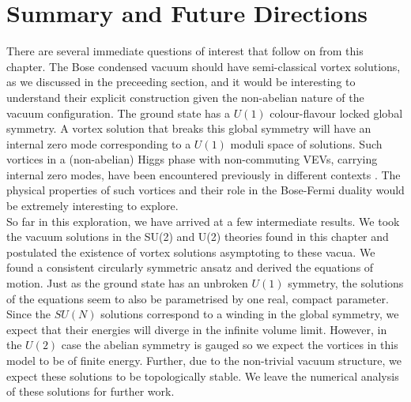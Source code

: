 \section{Summary and Future Directions}
\label{sec5}
There are several immediate questions of interest that follow on from this chapter.
The Bose condensed vacuum should have semi-classical vortex solutions, as we discussed in the preceeding section, and it would be interesting to understand their explicit construction given the non-abelian nature of the vacuum configuration. The ground state has a $U(1)$ colour-flavour locked global symmetry. A vortex solution that breaks this global symmetry will have an internal zero mode corresponding to a $U(1)$ moduli space of solutions.  Such vortices in a (non-abelian) Higgs phase with non-commuting VEVs, carrying internal zero modes, have been encountered previously in different contexts \cite{Markov:2004mj, Auzzi:2008ep, Auzzi:2009es}. The physical properties of such vortices and their role in the Bose-Fermi duality would be extremely interesting to explore.\\
    \indent So far in this exploration, we have arrived at a few intermediate results. We took the vacuum solutions in the SU(2) and U(2) theories found in this chapter and postulated the existence of vortex solutions asymptoting to these vacua. We found a consistent circularly symmetric ansatz and derived the equations of motion. Just as the ground state has an unbroken $U(1)$ symmetry, the solutions of the equations seem to also be parametrised by one real, compact parameter. Since the $SU(N)$ solutions correspond to a winding in the global symmetry, we expect that their energies will diverge in the infinite volume limit. However, in the $U(2)$ case the abelian symmetry is gauged so we expect the vortices in this model to be of finite energy. Further, due to the non-trivial vacuum structure, we expect these solutions to be topologically stable. We leave the numerical analysis of these solutions for further work.

